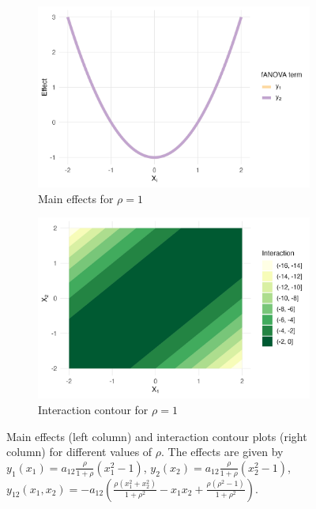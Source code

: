 \begin{figure}[htpb]
    \vspace{0.5em}
    \begin{subfigure}[t]{0.49\textwidth}
        \centering
        \includegraphics[width=\textwidth]{images/experiment_section/interaction_a1p00_a2p00_a11p00_a22p00_a12p20_rhop10_main.png}
        \caption{Main effects for $\rho = 1$}
    \end{subfigure}%
    \hfill
    \begin{subfigure}[t]{0.49\textwidth}
        \centering
        \includegraphics[width=\textwidth]{images/experiment_section/interaction_a1p00_a2p00_a11p00_a22p00_a12p20_rhop10_interaction.png}
        \caption{Interaction contour for $\rho = 1$}
    \end{subfigure}

    \caption{Main effects (left column) and interaction contour plots (right column) for different values of $\rho$. The effects are given by $y_{1}(x_1) = a_{12} \frac{\rho}{1+ \rho} (x_1^2 - 1)$,
    $y_{2}(x_2) = a_{12} \frac{\rho}{1+ \rho} (x_2^2 - 1)$,
    $y_{12}(x_1,x_2) = -a_{12}\!\left(\frac{\rho(x_1^2+x_2^2)}{1+\rho^2} - x_1 x_2 + \frac{\rho(\rho^2-1)}{1+\rho^2}\right)$.}
    \label{fig:interaction_combined}
\end{figure}




